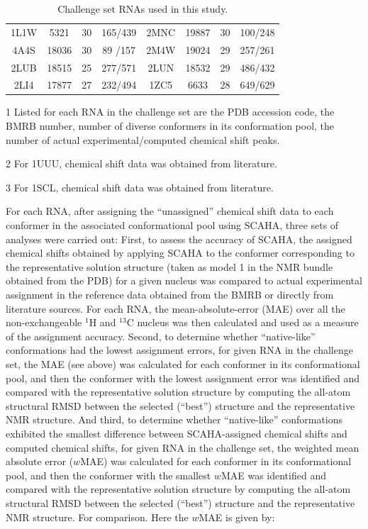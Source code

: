 \documentclass[journal=jcisd8,manuscript=article,layout=onecolumn]{achemso}
\begin{document}
\begin{table}[h!]
\begin{threeparttable}
\begin{tabular}{c c c c | c c c c}
1L1W & 5321  & 30 & 165/439 & 2MNC & 19887 & 30 & 100/248 \\
4A4S & 18036 & 30 & 89 /157 & 2M4W & 19024 & 29 & 257/261 \\
2LUB & 18515 & 25 & 277/571 & 2LUN & 18532 & 29 & 486/432 \\
2LI4 & 17877 & 27 & 232/494 & 1ZC5 & 6633  & 28 & 649/629 \\
\hline
\end{tabular}
\begin{tablenotes}
\item[1] Listed for each RNA in the challenge set are the PDB accession code, the BMRB number, number of diverse conformers in its conformation pool, the number of actual experimental/computed chemical shift peaks.
\item[2] For 1UUU, chemical shift data was obtained from literature\cite{sich1997structure}.
\item[3] For 1SCL, chemical shift data was obtained from literature\cite{szewczak1995sarcin}.

\end{tablenotes}
\end{threeparttable}
\caption{\label{tab:testing_set}  Challenge set RNAs used in this study.}
\end{table}

For each RNA, after assigning the ``unassigned'' chemical shift data to each conformer in the associated conformational pool using SCAHA, three sets of analyses were carried out:  First, to assess the accuracy of SCAHA, the assigned chemical shifts obtained by applying SCAHA to the conformer corresponding to the representative solution structure (taken as model 1 in the NMR bundle obtained from the PDB) for a given nucleus was compared to actual experimental assignment in the reference data obtained from the BMRB or directly from literature sources. For each RNA, the mean-absolute-error (MAE) over all the non-exchangeable $^{1}$H and $^{13}$C nucleus was then calculated and used as a measure of the assignment accuracy. Second, to determine whether ``native-like'' conformations had the lowest assignment errors, for given RNA in the challenge set, the MAE (see above) was calculated for each conformer in its conformational pool, and then the conformer with the lowest assignment error was identified and compared with the representative solution structure by computing the all-atom structural RMSD between the selected (``best'')  structure and the representative NMR structure. And third, to determine whether ``native-like'' conformations exhibited the smallest difference between SCAHA-assigned chemical shifts and computed chemical shifts, for given RNA in the challenge set, the weighted mean absolute error ($w$MAE) was calculated for each conformer in its conformational pool, and then the conformer with the smallest $w$MAE was identified and compared with the representative solution structure by computing the all-atom structural RMSD between the selected (``best'')  structure and the representative NMR structure. For comparison.  Here the $w$MAE is given by:
\end{document}
